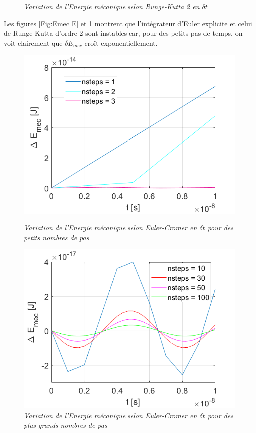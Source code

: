 \documentclass[a4paper,12pt,twoside]{article}
\begin{document}
\begin{figure}[h]
\begin{minipage}[c]{.46\linewidth}
			\caption{\em\label{Fig: Emec RK2} Variation de l'Energie m\'ecanique selon Runge-Kutta 2 en $\delta t$}
		\end{minipage}
	\end{figure}

		Les figures \ref{Fig:Emec E} et \ref{Fig: Emec RK2} montrent que l'int\'egrateur d'Euler explicite et celui de Runge-Kutta d'ordre 2 sont instables car, pour des petits pas de temps, on voit clairement que $\delta E_{mec}$ croît exponentiellement. 
		
				\begin{figure}[h]
				\begin{minipage}[c]{.46\linewidth}
					\centering
					\includegraphics[scale = 0.6]{D_E_mec_EC_n=1_2_3.png}
					\caption{\em\label{Fig:Emec EC} Variation de l'Energie m\'ecanique selon Euler-Cromer en $\delta t$ pour des petits nombres de pas }
				\end{minipage}
				\hfill%
				\begin{minipage}[c]{.46\linewidth}
					\centering
					\includegraphics[scale = 0.6]{D_E_mec_Ec_n=10_20_50_100.png}
					\caption{\em\label{Fig: Emec ECC} Variation de l'Energie m\'ecanique selon Euler-Cromer en $\delta t$ pour des plus grands nombres de pas}
				\end{minipage}
			\end{figure}
		
\end{document}
